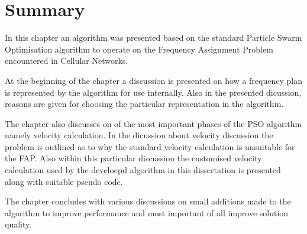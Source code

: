 \section{Summary}
In this chapter an algorithm was presented based on the standard Particle Swarm Optimisation algorithm to operate on the Frequency Assignment Problem encountered in Cellular Networks.

At the beginning of the chapter a discussion is presented on how a frequency plan is represented by the algorithm for use internally. Also in the presented dicussion, reasons are given for choosing the particular representation in the algorithm.

The chapter also discusses on of the most important phases of the PSO algorithm namely velocity calculation. In the dicussion about velocity discussion the problem is outlined as to why the standard velocity calculation is unsuitable for the FAP. Also within this particular discussion the customised velocity calculation used by the develoepd algorithm in this dissertation is presented along with suitable pseudo code.

The chapter concludes with various discussions on small additions made to the algorithm to improve performance and most important of all improve solution quality.
